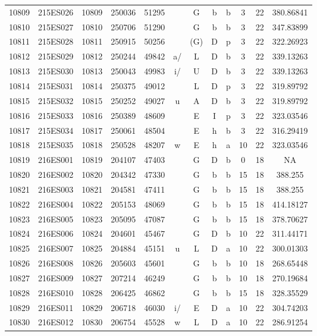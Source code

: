 \begin{tabular}{|*{12}{c|}}
10809 & 215ES026 & 10809 & 250036 & 51295 &  & G & b & b & 3 & 22 & 380.86841 \\ 
10810 & 215ES027 & 10810 & 250706 & 51290 &  & G & b & b & 3 & 22 & 347.83899 \\ 
10811 & 215ES028 & 10811 & 250915 & 50256 &  & (G) & D & p & 3 & 22 & 322.26923 \\ 
10812 & 215ES029 & 10812 & 250244 & 49842 & a/ & L & D & b & 3 & 22 & 339.13263 \\ 
10813 & 215ES030 & 10813 & 250043 & 49983 & i/ & U & D & b & 3 & 22 & 339.13263 \\ 
10814 & 215ES031 & 10814 & 250375 & 49012 &  & L & D & p & 3 & 22 & 319.89792 \\ 
10815 & 215ES032 & 10815 & 250252 & 49027 & u & A & D & b & 3 & 22 & 319.89792 \\ 
10816 & 215ES033 & 10816 & 250389 & 48609 &  & E & I & p & 3 & 22 & 323.03546 \\ 
10817 & 215ES034 & 10817 & 250061 & 48504 &  & E & h & b & 3 & 22 & 316.29419 \\ 
10818 & 215ES035 & 10818 & 250528 & 48207 & w & E & h & a & 10 & 22 & 323.03546 \\ 
10819 & 216ES001 & 10819 & 204107 & 47403 &  & G & D & b & 0 & 18 & NA \\ 
10820 & 216ES002 & 10820 & 204342 & 47330 &  & G & b & b & 15 & 18 & 388.255 \\ 
10821 & 216ES003 & 10821 & 204581 & 47411 &  & G & b & b & 15 & 18 & 388.255 \\ 
10822 & 216ES004 & 10822 & 205153 & 48069 &  & G & b & b & 15 & 18 & 414.18127 \\ 
10823 & 216ES005 & 10823 & 205095 & 47087 &  & G & b & b & 15 & 18 & 378.70627 \\ 
10824 & 216ES006 & 10824 & 204601 & 45467 &  & G & D & b & 10 & 22 & 311.44171 \\ 
10825 & 216ES007 & 10825 & 204884 & 45151 & u & L & D & a & 10 & 22 & 300.01303 \\ 
10826 & 216ES008 & 10826 & 205603 & 45601 &  & G & b & b & 10 & 18 & 268.65448 \\ 
10827 & 216ES009 & 10827 & 207214 & 46249 &  & G & b & b & 10 & 18 & 270.19684 \\ 
10828 & 216ES010 & 10828 & 206425 & 46862 &  & G & b & b & 15 & 18 & 328.35529 \\ 
10829 & 216ES011 & 10829 & 206718 & 46030 & i/ & E & D & a & 10 & 22 & 304.74203 \\ 
10830 & 216ES012 & 10830 & 206754 & 45528 & w & L & D & a & 10 & 22 & 286.91254 \\ 

\end{tabular}
